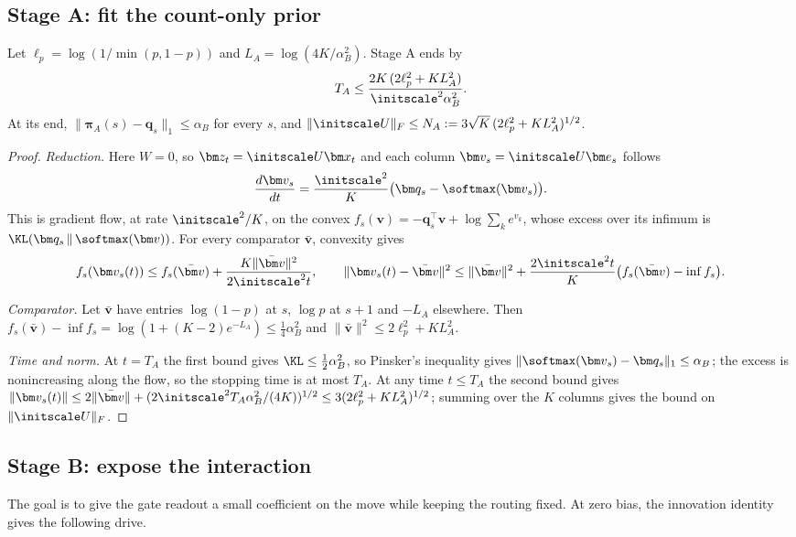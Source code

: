 \subsection{Stage A: fit the count-only prior}
\begin{lemma}[Stage A]
\label{lem:R-A}
Let $\ell_p=\log(1/\min(p,1-p))$ and $L_A=\log(4K/\alpha_B^2)$. Stage A ends by
\[
 T_A\le\frac{2K\,(2\ell_p^2+KL_A^2)}{\initscale^2\alpha_B^2}.
\]
At its end, $\|\bm\pi_A(s)-\bm q_s\|_1\le\alpha_B$ for every $s$, and $\|\initscale U\|_F\le N_A:=3\sqrt K\,(2\ell_p^2+KL_A^2)^{1/2}$.
\end{lemma}

\begin{proof}
\emph{Reduction.} Here $W=0$, so $\bm z_t=\initscale U\bm x_t$ and each column $\bm v_s=\initscale U\bm e_s$ follows
\[
 \frac{d\bm v_s}{dt}=\frac{\initscale^2}K\bigl(\bm q_s-\softmax(\bm v_s)\bigr).
\]
This is gradient flow, at rate $\initscale^2/K$, on the convex $f_s(\bm v)=-\bm q_s^\top\bm v+\log\sum_ke^{v_k}$, whose excess over its infimum
is $\KL(\bm q_s\,\|\,\softmax(\bm v))$. For every comparator $\bar{\bm v}$, convexity gives
\[
 f_s(\bm v_s(t))\le f_s(\bar{\bm v})+\frac{K\|\bar{\bm v}\|^2}{2\initscale^2t},
 \qquad
 \|\bm v_s(t)-\bar{\bm v}\|^2\le\|\bar{\bm v}\|^2+\frac{2\initscale^2t}K\bigl(f_s(\bar{\bm v})-\inf f_s\bigr).
\]

\emph{Comparator.} Let $\bar{\bm v}$ have entries $\log(1-p)$ at $s$, $\log p$ at $s+1$ and $-L_A$ elsewhere. Then
$f_s(\bar{\bm v})-\inf f_s=\log(1+(K-2)e^{-L_A})\le\tfrac14\alpha_B^2$ and $\|\bar{\bm v}\|^2\le2\ell_p^2+KL_A^2$.

\emph{Time and norm.} At $t=T_A$ the first bound gives $\KL\le\tfrac12\alpha_B^2$, so Pinsker's inequality gives
$\|\softmax(\bm v_s)-\bm q_s\|_1\le\alpha_B$; the excess is nonincreasing along the flow, so the stopping time is at most $T_A$. At any
time $t\le T_A$ the second bound gives $\|\bm v_s(t)\|\le2\|\bar{\bm v}\|+(2\initscale^2T_A\alpha_B^2/(4K))^{1/2}\le3(2\ell_p^2+KL_A^2)^{1/2}$;
summing over the $K$ columns gives the bound on $\|\initscale U\|_F$.
\end{proof}

\subsection{Stage B: expose the interaction}
The goal is to give the gate readout a small coefficient on the move while keeping the routing fixed.
At zero bias, the innovation identity gives the following drive.

